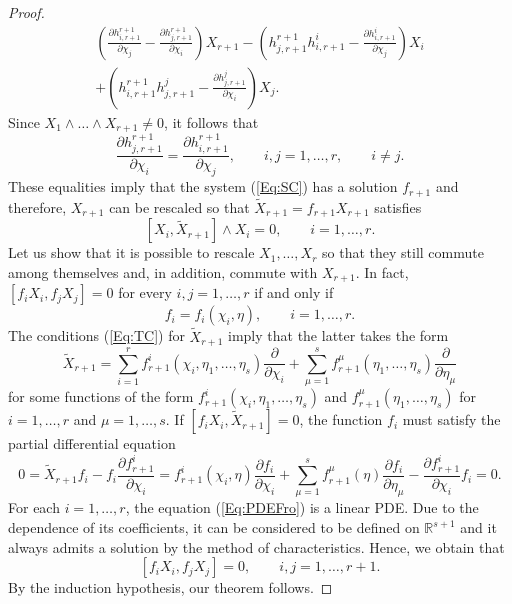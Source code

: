 \documentclass{birkjour}
\theoremstyle{definition}
\theoremstyle{remark}
\numberwithin{equation}{section}
\numberwithin{equation}{section}
\numberwithin{thm}{section}
\numberwithin{equation}{section}
\numberwithin{thm}{section}
\begin{document}
\begin{proof}
\begin{multline*}
		\left(\frac{\partial h_{i,r+1}^{r+1}}{\partial \chi_j}-\frac{\partial h_{j,r+1}^{r+1}}{\partial \chi_i}\right)X_{r+1}-\left(h_{j,r+1}^{r+1}h_{i,r+1}^{i}-\frac{\partial h^i_{i,r+1}}{\partial \chi_j}\right)X_i\\+\left(h^{r+1}_{i,r+1}h_{j,r+1}^j-\frac{\partial h^j_{j,r+1}}{\partial \chi_i}\right)X_j.
	\end{multline*}
	Since $X_1\wedge\ldots\wedge X_{r+1}\neq 0$, it follows that
	\begin{equation}\label{eq:ConS}
		\frac{\partial h_{j,r+1}^{r+1}}{\partial \chi_i}=\frac{\partial h_{i,r+1}^{r+1}}{\partial \chi_j},\qquad i,j=1,\ldots,r,\qquad i\neq j.
	\end{equation}
	These equalities imply that the system (\ref{Eq:SC}) has a solution  $f_{r+1}$ and therefore, $X_{r+1}$ can be rescaled so that $\widetilde{X}_{r+1}=f_{r+1}X_{r+1}$ satisfies
	\begin{equation}\label{Eq:TC}
		[X_i,\widetilde{X}_{r+1}]\wedge X_{i}=0,\qquad i=1,\ldots,r.
	\end{equation}
	Let us show that it is possible to rescale $X_1,\ldots, X_r$ so that they still commute among themselves and, in addition,  commute with $X_{r+1}$. In fact,  $[f_iX_i,f_jX_j]=0$ for every $i,j=1,\ldots,r$ if and only if 
	$$
	f_i=f_i(\chi_i,\eta),\qquad i=1,\ldots,r.
	$$
	The conditions (\ref{Eq:TC}) for $\widetilde{X}_{r+1}$ imply that the latter takes the form
	$$
	\widetilde{X}_{r+1}=\sum_{i=1}^rf^i_{r+1}(\chi_i,\eta_1,\ldots,\eta_s)\frac{\partial}{\partial \chi_i}+\sum_{\mu=1}^sf^\mu_{r+1}(\eta_1,\ldots,\eta_s)\frac{\partial}{\partial \eta_\mu}
	$$
	for some functions of the form $f_{r+1}^i(\chi_i,\eta_1,\ldots,\eta_s)$ and $f^\mu_{r+1}(\eta_1,\ldots,\eta_s)$ for $i=1,\ldots,r$ and   $\mu=1,\ldots,s$. 
	If $[f_iX_i,\widetilde{X}_{r+1}]=0$, the function $f_i$ must satisfy the partial differential equation
	\begin{equation}\label{Eq:PDEFro}
		0=\widetilde {X}_{r+1}f_i-f_i\frac{\partial f^i_{r+1}}{\partial \chi_i}=f^i_{r+1}(\chi_i,\eta)\frac{\partial f_i}{\partial \chi_i}+\sum_{\mu=1}^sf^\mu_{r+1}(\eta)\frac{\partial f_i}{\partial \eta_\mu}-\frac{\partial f^i_{r+1}}{\partial \chi_i}f_i=0.
	\end{equation}
	For each $i=1,\ldots,r$, the equation (\ref{Eq:PDEFro}) is a linear PDE. Due to the dependence of its coefficients, it can be considered to be defined on $\mathbb{R}^{s+1}$ and it always admits  a solution by the method of characteristics. Hence, we obtain that
	$$
	[f_iX_i,f_jX_j]=0,\qquad i,j=1,\ldots,r+1.
	$$
	By the induction hypothesis, our theorem follows.
\end{proof}
\end{document}
